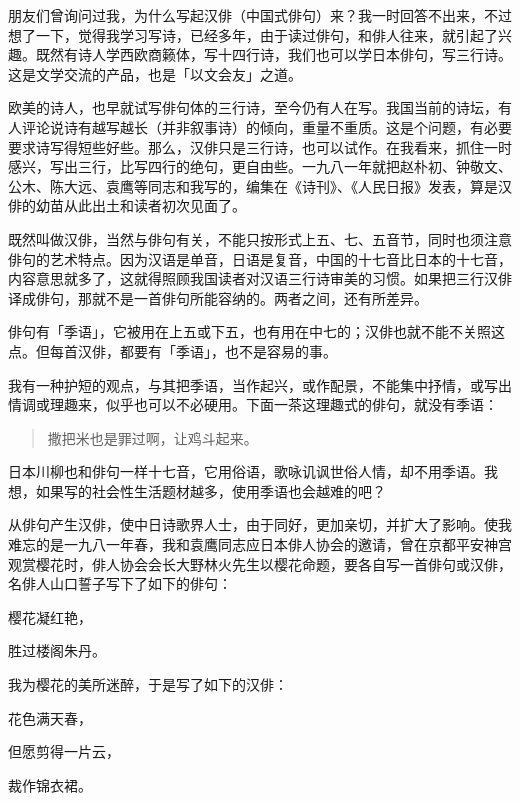 {  朋友们曾询问过我，为什么写起汉俳（中国式俳句）来？我一时回答不出来，不过想了一下，觉得我学习写诗，已经多年，由于读过俳句，和俳人往来，就引起了兴趣。既然有诗人学西欧商籁体，写十四行诗，我们也可以学日本俳句，写三行诗。这是文学交流的产品，也是「以文会友」之道。

  欧美的诗人，也早就试写俳句体的三行诗，至今仍有人在写。我国当前的诗坛，有人评论说诗有越写越长（并非叙事诗）的倾向，重量不重质。这是个问题，有必要要求诗写得短些好些。那么，汉俳只是三行诗，也可以试作。在我看来，抓住一时感兴，写出三行，比写四行的绝句，更自由些。一九八一年就把赵朴初、钟敬文、公木、陈大远、袁鹰等同志和我写的，编集在《诗刊》、《人民日报》发表，算是汉俳的幼苗从此出土和读者初次见面了。

  既然叫做汉俳，当然与俳句有关，不能只按形式上五、七、五音节，同时也须注意俳句的艺术特点。因为汉语是单音，日语是复音，中国的十七音比日本的十七音，内容意思就多了，这就得照顾我国读者对汉语三行诗审美的习惯。如果把三行汉俳译成俳句，那就不是一首俳句所能容纳的。两者之间，还有所差异。

  俳句有「季语」，它被用在上五或下五，也有用在中七的；汉俳也就不能不关照这点。但每首汉俳，都要有「季语」，也不是容易的事。

  我有一种护短的观点，与其把季语，当作起兴，或作配景，不能集中抒情，或写出情调或理趣来，似乎也可以不必硬用。下面一茶这理趣式的俳句，就没有季语：

  \begin{quote}
      撒把米也是罪过啊，让鸡斗起来。
  \end{quote}

  日本川柳也和俳句一样十七音，它用俗语，歌咏讥讽世俗人情，却不用季语。我想，如果写的社会性生活题材越多，使用季语也会越难的吧？

  从俳句产生汉俳，使中日诗歌界人士，由于同好，更加亲切，并扩大了影响。使我难忘的是一九八一年春，我和袁鹰同志应日本俳人协会的邀请，曾在京都平安神宫观赏樱花时，俳人协会会长大野林火先生以樱花命题，要各自写一首俳句或汉俳，名俳人山口誓子写下了如下的俳句：

  \begin{center}
      樱花凝红艳，

      胜过楼阁朱丹。
  \end{center}

  我为樱花的美所迷醉，于是写了如下的汉俳：

  \begin{center}
      花色满天春，

      但愿剪得一片云，

      裁作锦衣裙。
  \end{center}

}
